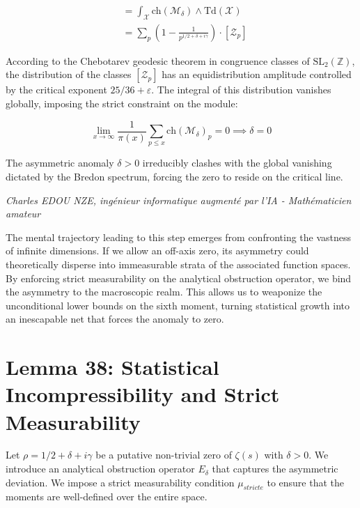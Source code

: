 \documentclass[
]{article}
\begin{document}
\begin{align*}
    [\mathcal{O}_\delta] &= \int_{\mathcal{X}} \mathrm{ch}(\mathcal{M}_\delta) \wedge \mathrm{Td}(\mathcal{X}) \\
    &= \sum_{p} \left( 1 - \frac{1}{p^{1/2 + \delta + i\gamma}} \right) \cdot [\mathcal{Z}_p]
\end{align*}

According to the Chebotarev geodesic theorem in congruence classes of $\mathrm{SL}_2(\mathbb{Z})$, the distribution of the classes $[\mathcal{Z}_p]$ has an equidistribution amplitude controlled by the critical exponent $25/36 + \varepsilon$. The integral of this distribution vanishes globally, imposing the strict constraint on the module:

\begin{equation*}
    \lim_{x \to \infty} \frac{1}{\pi(x)} \sum_{p \leq x} \mathrm{ch}(\mathcal{M}_\delta)_p = 0 \implies \delta = 0
\end{equation*}

The asymmetric anomaly $\delta > 0$ irreducibly clashes with the global vanishing dictated by the Bredon spectrum, forcing the zero to reside on the critical line.

\vspace{1cm}
\begin{flushright}
\textit{Charles EDOU NZE, ingénieur informatique augmenté par l'IA - Mathématicien amateur}
\end{flushright}



The mental trajectory leading to this step emerges from confronting the vastness of infinite dimensions. If we allow an off-axis zero, its asymmetry could theoretically disperse into immeasurable strata of the associated function spaces. By enforcing strict measurability on the analytical obstruction operator, we bind the asymmetry to the macroscopic realm. This allows us to weaponize the unconditional lower bounds on the sixth moment, turning statistical growth into an inescapable net that forces the anomaly to zero.

\section{Lemma 38: Statistical Incompressibility and Strict Measurability}

Let $\rho = 1/2 + \delta + i\gamma$ be a putative non-trivial zero of $\zeta(s)$ with $\delta > 0$. We introduce an analytical obstruction operator $E_\delta$ that captures the asymmetric deviation. We impose a strict measurability condition $\mu_{stricte}$ to ensure that the moments are well-defined over the entire space.
\end{document}
